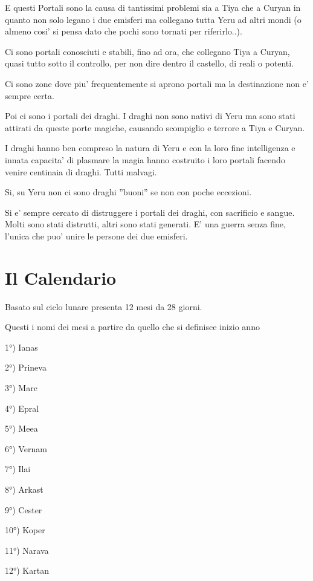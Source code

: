 \documentclass[a4paper,11pt,twoside,openany]{book}
\begin{document}
E questi Portali sono la causa di tantissimi problemi sia a Tiya che a Curyan in quanto non solo legano i due emisferi ma collegano tutta Yeru ad altri mondi (o almeno cosi' si pensa dato che pochi sono tornati per riferirlo..).

Ci sono portali conosciuti e stabili, fino ad ora, che collegano Tiya a Curyan, quasi tutto sotto il controllo, per non dire dentro il castello, di reali o potenti.

Ci sono zone dove piu' frequentemente si aprono portali ma la destinazione non e' sempre certa.

Poi ci sono i portali dei draghi. I draghi non sono nativi di Yeru ma sono stati attirati da queste porte magiche, causando scompiglio e terrore a Tiya e Curyan.

I draghi hanno ben compreso la natura di Yeru e con la loro fine intelligenza e innata capacita' di plasmare la magia hanno costruito i loro portali facendo venire centinaia di draghi. Tutti malvagi.

Si, su Yeru non ci sono draghi ''buoni'' se non con poche eccezioni.

Si e' sempre cercato di distruggere i portali dei draghi, con sacrificio e sangue. Molti sono stati distrutti, altri sono stati generati. E' una guerra senza fine, l'unica che puo' unire le persone dei due emisferi. 

\pagebreak

\section{Il Calendario}

\label{il-calendario}

Basato sul ciclo lunare presenta 12 mesi da 28 giorni.

Questi i nomi dei mesi a partire da quello che si definisce inizio
anno
\bigskip

1°) Ianas

2°) Prineva

3°) Marc

4°) Epral

5°) Meea

6°) Vernam

7°) Ilai

8°) Arkast

9°) Cester

10°) Koper

11°) Narava

12°) Kartan
\end{document}
